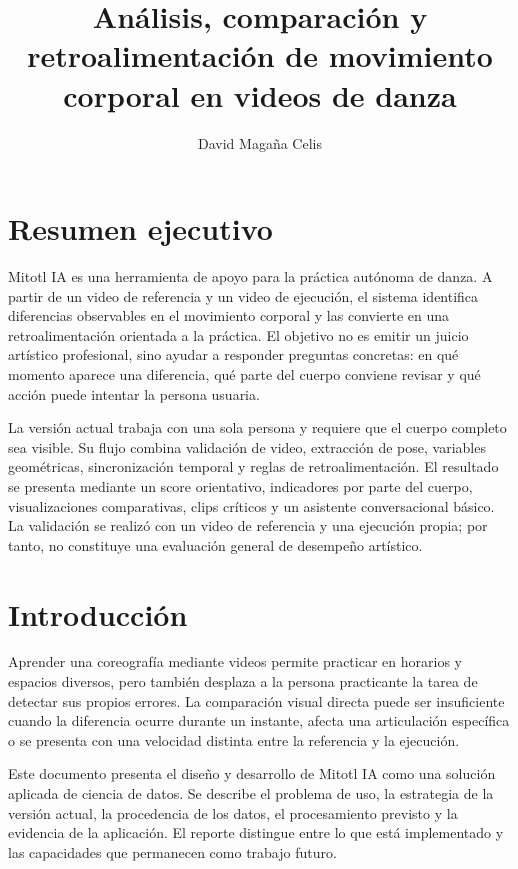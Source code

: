\documentclass[12pt,a4paper]{article}
\title{Análisis, comparación y retroalimentación de movimiento corporal en videos de danza}
\author{David Magaña Celis}
\begin{document}
\maketitle

\tableofcontents
\clearpage

\section*{Resumen ejecutivo}
Mitotl IA es una herramienta de apoyo para la práctica autónoma de danza. A partir de un video de referencia y un video de ejecución, el sistema identifica diferencias observables en el movimiento corporal y las convierte en una retroalimentación orientada a la práctica. El objetivo no es emitir un juicio artístico profesional, sino ayudar a responder preguntas concretas: en qué momento aparece una diferencia, qué parte del cuerpo conviene revisar y qué acción puede intentar la persona usuaria.

La versión actual trabaja con una sola persona y requiere que el cuerpo completo sea visible. Su flujo combina validación de video, extracción de pose, variables geométricas, sincronización temporal y reglas de retroalimentación. El resultado se presenta mediante un score orientativo, indicadores por parte del cuerpo, visualizaciones comparativas, clips críticos y un asistente conversacional básico. La validación se realizó con un video de referencia y una ejecución propia; por tanto, no constituye una evaluación general de desempeño artístico.

\section{Introducción}
Aprender una coreografía mediante videos permite practicar en horarios y espacios diversos, pero también desplaza a la persona practicante la tarea de detectar sus propios errores. La comparación visual directa puede ser insuficiente cuando la diferencia ocurre durante un instante, afecta una articulación específica o se presenta con una velocidad distinta entre la referencia y la ejecución.

Este documento presenta el diseño y desarrollo de Mitotl IA como una solución aplicada de ciencia de datos. Se describe el problema de uso, la estrategia de la versión actual, la procedencia de los datos, el procesamiento previsto y la evidencia de la aplicación. El reporte distingue entre lo que está implementado y las capacidades que permanecen como trabajo futuro.
\end{document}
